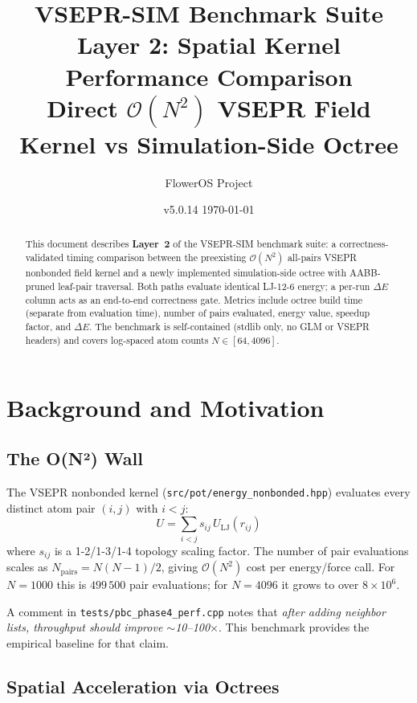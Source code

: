 \documentclass[11pt,a4paper]{article}
\title{%
  \textbf{VSEPR-SIM Benchmark Suite} \\[4pt]
  \Large Layer 2: Spatial Kernel Performance Comparison \\[14pt]
  \normalsize Direct $\mathcal{O}(N^2)$ VSEPR Field Kernel
  \quad vs \quad Simulation-Side Octree%
}
\author{FlowerOS Project}
\date{v5.0.14 \quad \today}
\theoremstyle{definition}
\theoremstyle{plain}
\newcommand{\Nq}{N_{\mathrm{pairs}}}
\newcommand{\Otwo}{\mathcal{O}(N^2)}
\begin{document}
\maketitle
\thispagestyle{empty}

\begin{abstract}
This document describes \textbf{Layer~2} of the VSEPR-SIM benchmark suite:
a correctness-validated timing comparison between the preexisting
$\mathcal{O}(N^2)$ all-pairs VSEPR nonbonded field kernel and a newly
implemented simulation-side octree with AABB-pruned leaf-pair traversal.
Both paths evaluate identical LJ-12-6 energy; a per-run $\Delta E$ column
acts as an end-to-end correctness gate.  Metrics include octree build time
(separate from evaluation time), number of pairs evaluated, energy value,
speedup factor, and $\Delta E$.
The benchmark is self-contained (stdlib only, no GLM or VSEPR headers) and
covers log-spaced atom counts $N \in [64, 4096]$.
\end{abstract}

\tableofcontents
\newpage

\section{Background and Motivation}
\label{sec:background}

\subsection{The O(N²) Wall}

The VSEPR nonbonded kernel (\texttt{src/pot/energy\_nonbonded.hpp}) evaluates
every distinct atom pair $(i, j)$ with $i < j$:
\begin{equation}
  U = \sum_{i < j} s_{ij}\,U_{\mathrm{LJ}}(r_{ij})
  \label{eq:direct-sum}
\end{equation}
where $s_{ij}$ is a 1-2/1-3/1-4 topology scaling factor.
The number of pair evaluations scales as $\Nq = N(N-1)/2$, giving
$\Otwo$ cost per energy/force call.  For $N = 1000$ this is $499\,500$
pair evaluations; for $N = 4096$ it grows to over $8 \times 10^6$.

A comment in \texttt{tests/pbc\_phase4\_perf.cpp} notes that
\emph{after adding neighbor lists, throughput should improve $\sim$10--100$\times$}.
This benchmark provides the empirical baseline for that claim.

\subsection{Spatial Acceleration via Octrees}
\end{document}
